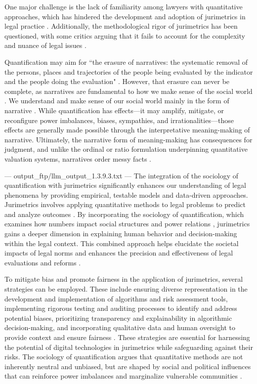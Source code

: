 One major challenge is the lack of familiarity among lawyers with quantitative approaches, which has hindered the development and adoption of jurimetrics in legal practice \cite{l2010de}. Additionally, the methodological rigor of jurimetrics has been questioned, with some critics arguing that it fails to account for the complexity and nuance of legal issues \cite{nunes2016jurimetria}.

Quantification may aim for “the erasure of narratives: the systematic removal of the persons, places and trajectories of the people being evaluated by the indicator and the people doing the evaluation" \cite{10_1111_lsi_12334}. However, that erasure can never be complete, as narratives are fundamental to how we make sense of the social world \cite{bruner1991, ewick2003}. We understand and make sense of our social world mainly in the form of narrative \cite{bruner1991}. While quantification has effects—it may amplify, mitigate, or reconfigure power imbalances, biases, sympathies, and irrationalities—those effects are generally made possible through the interpretative meaning-making of narrative. Ultimately, the narrative form of meaning-making has consequences for judgment, and unlike the ordinal or ratio formulation underpinning quantitative valuation systems, narratives order messy facts \cite{10_1111_lsi_12334}.


---
output_ftp/llm_output_1.3.9.3.txt
---
The integration of the sociology of quantification with jurimetrics significantly enhances our understanding of legal phenomena by providing empirical, testable models and data-driven approaches. Jurimetrics involves applying quantitative methods to legal problems to predict and analyze outcomes \cite{de2010,zabala2019,nunes2018}. By incorporating the sociology of quantification, which examines how numbers impact social structures and power relations \cite{paiva2021}, jurimetrics gains a deeper dimension in explaining human behavior and decision-making within the legal context. This combined approach helps elucidate the societal impacts of legal norms and enhances the precision and effectiveness of legal evaluations and reforms \cite{nunes2018,nunes2018a}.

To mitigate bias and promote fairness in the application of jurimetrics, several strategies can be employed. These include ensuring diverse representation in the development and implementation of algorithms and risk assessment tools, implementing rigorous testing and auditing processes to identify and address potential biases, prioritizing transparency and explainability in algorithmic decision-making, and incorporating qualitative data and human oversight to provide context and ensure fairness \cite{10.1007/s11186-021-09453-1,unger2021process}. These strategies are essential for harnessing the potential of digital technologies in jurimetrics while safeguarding against their risks. The sociology of quantification argues that quantitative methods are not inherently neutral and unbiased, but are shaped by social and political influences that can reinforce power imbalances and marginalize vulnerable communities \cite{10.1590/data.2022.65.3.267,loevinger1959}.

